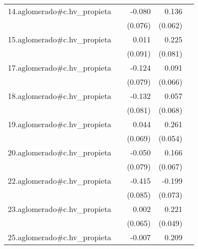 {\begin{longtable}{l*{4}{D{.}{.}{-1}}}
\addlinespace
14.aglomerado#c.hv\_propieta&                     &      -0.080         &       0.136\sym{*}  &                     \\
            &                     &     (0.076)         &     (0.062)         &                     \\
\addlinespace
15.aglomerado#c.hv\_propieta&                     &       0.011         &       0.225\sym{**} &                     \\
            &                     &     (0.091)         &     (0.081)         &                     \\
\addlinespace
17.aglomerado#c.hv\_propieta&                     &      -0.124         &       0.091         &                     \\
            &                     &     (0.079)         &     (0.066)         &                     \\
\addlinespace
18.aglomerado#c.hv\_propieta&                     &      -0.132         &       0.057         &                     \\
            &                     &     (0.081)         &     (0.068)         &                     \\
\addlinespace
19.aglomerado#c.hv\_propieta&                     &       0.044         &       0.261\sym{***}&                     \\
            &                     &     (0.069)         &     (0.054)         &                     \\
\addlinespace
20.aglomerado#c.hv\_propieta&                     &      -0.050         &       0.166\sym{*}  &                     \\
            &                     &     (0.079)         &     (0.067)         &                     \\
\addlinespace
22.aglomerado#c.hv\_propieta&                     &      -0.415\sym{***}&      -0.199\sym{**} &                     \\
            &                     &     (0.085)         &     (0.073)         &                     \\
\addlinespace
23.aglomerado#c.hv\_propieta&                     &       0.002         &       0.221\sym{***}&                     \\
            &                     &     (0.065)         &     (0.049)         &                     \\
\addlinespace
25.aglomerado#c.hv\_propieta&                     &      -0.007         &       0.209\sym{**} &                     \\

\end{longtable}}
